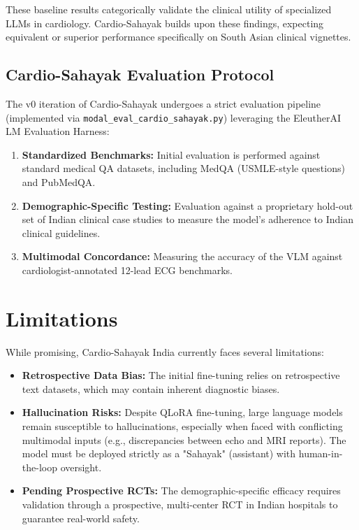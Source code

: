 \documentclass[11pt,a4paper]{article}
\begin{document}
These baseline results categorically validate the clinical utility of specialized LLMs in cardiology. Cardio-Sahayak builds upon these findings, expecting equivalent or superior performance specifically on South Asian clinical vignettes.

\subsection{Cardio-Sahayak Evaluation Protocol}
The v0 iteration of Cardio-Sahayak undergoes a strict evaluation pipeline (implemented via \texttt{modal\_eval\_cardio\_sahayak.py}) leveraging the EleutherAI LM Evaluation Harness:
\begin{enumerate}
    \item \textbf{Standardized Benchmarks:} Initial evaluation is performed against standard medical QA datasets, including MedQA (USMLE-style questions) and PubMedQA.
    \item \textbf{Demographic-Specific Testing:} Evaluation against a proprietary hold-out set of Indian clinical case studies to measure the model's adherence to Indian clinical guidelines.
    \item \textbf{Multimodal Concordance:} Measuring the accuracy of the VLM against cardiologist-annotated 12-lead ECG benchmarks.
\end{enumerate}

\section{Limitations}
While promising, Cardio-Sahayak India currently faces several limitations:
\begin{itemize}
    \item \textbf{Retrospective Data Bias:} The initial fine-tuning relies on retrospective text datasets, which may contain inherent diagnostic biases.
    \item \textbf{Hallucination Risks:} Despite QLoRA fine-tuning, large language models remain susceptible to hallucinations, especially when faced with conflicting multimodal inputs (e.g., discrepancies between echo and MRI reports). The model must be deployed strictly as a "Sahayak" (assistant) with human-in-the-loop oversight.
    \item \textbf{Pending Prospective RCTs:} The demographic-specific efficacy requires validation through a prospective, multi-center RCT in Indian hospitals to guarantee real-world safety.
\end{itemize}
\end{document}
